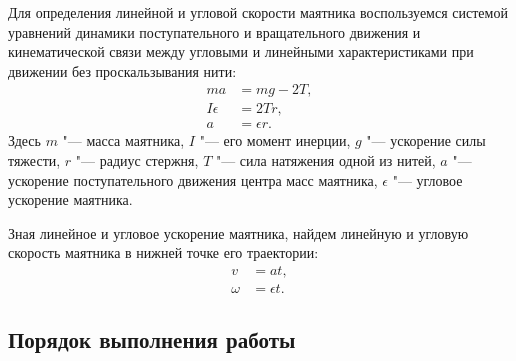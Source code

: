 \documentclass[a4paper, 12pt]{extarticle}
\newcommand{\eps}{\epsilon}
\begin{document}
Для определения линейной и угловой скорости маятника воспользуемся системой уравнений динамики поступательного и вращательного движения и кинематической связи между угловыми и линейными характеристиками при движении без проскальзывания нити:
\begin{align*} %
ma &= mg - 2T, \\ %
I \eps &= 2Tr, \\
a &= \eps r.
\end{align*}
Здесь  $m$ "--- масса маятника, $I$ "--- его момент инерции, $g$ "--- ускорение силы тяжести, $r$ "--- радиус стержня, $T$ "--- сила натяжения одной из нитей, $a$ "--- ускорение поступательного движения центра масс маятника, $\eps$ "--- угловое ускорение маятника.

Зная линейное и угловое ускорение маятника, найдем линейную и угловую скорость маятника в нижней точке его траектории:
\begin{align*}
v &= at, \\%
\omega &= \eps t.
\end{align*}

\subsection{Порядок выполнения работы}

\begin{figure}[h]
\begin{center}
\end{center}
\caption{\label{fig:m10-maxwell's-pendulum}}
\end{figure}

\begin{figure}[h]
\begin{center}
\end{center}
\caption{\label{fig:m10-wheel}}
\end{figure}
\end{document}
